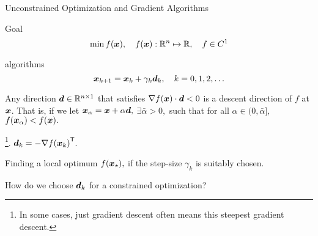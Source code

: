 \documentclass[handout,fleqn,aspectratio=169]{beamer}
\begin{document}
\begin{frame}{Unconstrained Optimization and Gradient Algorithms}



\plitemsep 0.1in

\bci 

\item Goal
$$
\min f(\bm{x}), \quad f(\bm{x}): {\mathbb R}^{n} \mapsto {\mathbb R}, \quad f \in C^1
$$

\medskip

\item {} algorithms
$$
\bm{x}_{k+1} = \bm{x}_{k} + \gamma_k \bm{d}_k, \quad k = 0,1,2, \ldots
$$


\item {} Any direction $\bm{d} \in {\mathbb R}^{n \times 1}$ that satisfies $\nabla f(\bm{x}) \cdot \bm{d} <0$ is a
  descent direction of $f$ at $\bm{x}$. That is, if we let $\bm{x}_{\alpha} = \bm{x} + \alpha
  \bm{d},$ $\exists \bar{\alpha} >0,$ such that for
  all $\alpha \in (0,\bar{\alpha}],$ $f(\bm{x}_\alpha) < f(\bm{x}).$


\item {}\footnote{In some cases, just gradient descent often means this steepest gradient descent.}. $\bm{d}_{k} = - {\nabla f(\bm{x}_k)}^{\mathsf{T}}.$


\item Finding a local optimum $f(\bm{x}_{\star}),$ if the step-size $\gamma_k$ is suitably chosen. 

\item \question How do we choose $\bm{d}_k$ for a constrained optimization? 

\eci
\end{frame}
\end{document}
